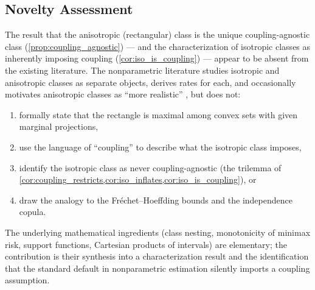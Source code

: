 

\subsection{Novelty Assessment}\label{sec:lit:novelty}

The result that the anisotropic (rectangular) class is the unique coupling-agnostic class (\cref{prop:coupling_agnostic}) --- and the characterization of isotropic classes as inherently imposing coupling (\cref{cor:iso_is_coupling}) --- appear to be absent from the existing literature.
The nonparametric literature studies isotropic and anisotropic classes as separate objects, derives rates for each, and occasionally motivates anisotropic classes as ``more realistic'' \parencite{bhattacharya_anisotropic_2014}, but does not:
\begin{enumerate}
	\item formally state that the rectangle is maximal among convex sets with given marginal projections,
	\item use the language of ``coupling'' to describe what the isotropic class imposes,
	\item identify the isotropic class as never coupling-agnostic (the trilemma of \cref{cor:coupling_restricts,cor:iso_inflates,cor:iso_is_coupling}), or
	\item draw the analogy to the Fréchet--Hoeffding bounds and the independence copula.
\end{enumerate}
The underlying mathematical ingredients (class nesting, monotonicity of minimax risk, support functions, Cartesian products of intervals) are elementary; the contribution is their synthesis into a characterization result and the identification that the standard default in nonparametric estimation silently imports a coupling assumption.



